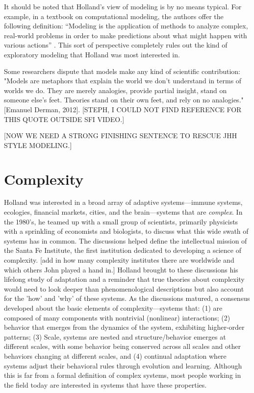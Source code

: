 \documentclass{sig-alternate}
\begin{document}
It should be noted that Holland's view of modeling is by no means
typical.  For example, in a textbook on computational modeling, the
authors offer the following definition: “Modeling is the application
of methods to analyze complex, real-world problems in order to make
predictions about what might happen with various actions”
\cite{Shiflet2014}.   This sort of perspective completely rules out the
kind of exploratory modeling that Holland was most interested in. 

Some researchers dispute that models make any kind of scientific
contribution: "Models are metaphors that explain the world we don't
understand in terms of worlds we do.  They are merely analogies,
provide partial insight, stand on someone else's feet.  Theories stand
on their own feet, and rely on no analogies."  [Emanuel Derman, 2012].
[STEPH, I COULD NOT FIND REFERENCE FOR THIS QUOTE OUTSIDE SFI VIDEO.]

[NOW WE NEED A STRONG FINISHING SENTENCE TO RESCUE JHH STYLE
  MODELING.]

\section{Complexity}


Holland was interested in a broad array of adaptive systems---immune systems, ecologies, financial markets, cities, and the brain---systems that are \emph{complex}.  In the 1980's, he teamed up with a small group of scientists, primarily physicists with a sprinkling of economists and biologists, to discuss what this wide swath of systems has in common.  The discussions helped define the intellectual mission of the Santa Fe Institute, the first institution dedicated to developing a science of complexity.  [add in how many complexity institutes there are worldwide and which others John played a hand in.]  Holland brought to these discussions his lifelong study of adaptation and a reminder that true theories about complexity would need to look deeper than phenomenological descriptions but also account for the  'how' and 'why' of these systems.
As the discussions matured, a consensus developed about the basic elements of complexity---systems that: (1)  are composed of many components with nontrivial (nonlinear) interactions; (2) behavior that emerges from the dynamics of the system, exhibiting higher-order patterns; (3) Scale, systems are nested and structure/behavior emerges at different scales, with some behavior being conserved across all scales and other behaviors changing at different scales, and (4) continual adaptation where systems adjust their behavioral rules through evolution and learning.  Although this is far from a formal definition of complex systems, most people working in the field today are interested in systems that have these properties.
\end{document}
